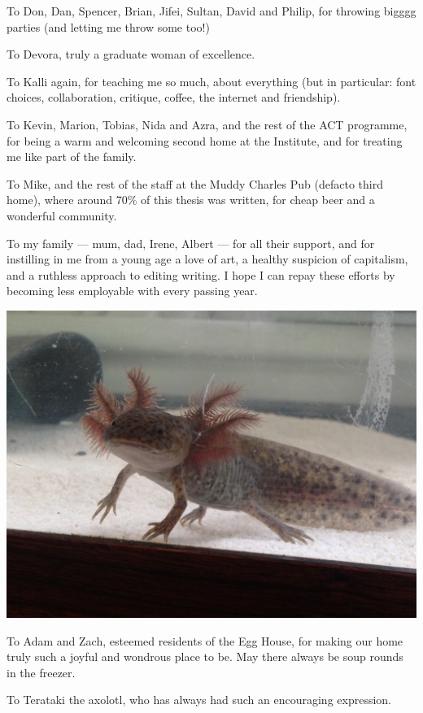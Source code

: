 \documentclass[nofonts,nols,justified,nobib]{tufte-book}
\begin{document}
To Don, Dan, Spencer, Brian, Jifei, Sultan, David and Philip, for throwing bigggg parties (and letting me throw some too!)

To Devora, truly a graduate woman of excellence.

To Kalli again, for teaching me so much, about everything (but in particular: font choices, collaboration, critique, coffee, the internet and friendship).

To Kevin, Marion, Tobias, Nida and Azra, and the rest of the ACT programme, for being a warm and welcoming second home at the Institute, and for treating me like part of the family.

To Mike, and the rest of the staff at the Muddy Charles Pub (defacto third home), where around 70\% of this thesis was written, for cheap beer and a wonderful community.

To my family — mum, dad, Irene, Albert — for all their support, and for instilling in me from a young age a love of art, a healthy suspicion of capitalism, and a ruthless approach to editing writing. I hope I can repay these efforts by becoming less employable with every passing year.

\begin{marginfigure}
\includegraphics[width=\textwidth]{img/1/terataki.jpg}
\end{marginfigure}

To Adam and Zach, esteemed residents of the Egg House, for making our home truly such a joyful and wondrous place to be. May there always be soup rounds in the freezer.

To Terataki the axolotl, who has always had such an encouraging expression.
\end{document}
